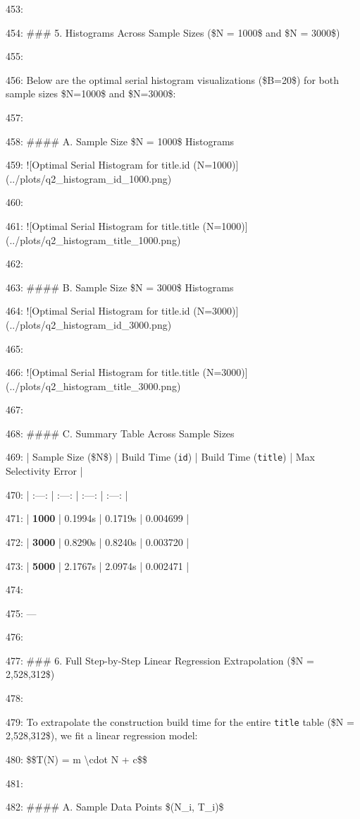 \documentclass[11pt,a4paper]{article}
\begin{document}
453:

454: \#\#\# 5. Histograms Across Sample Sizes (\$N = 1000\$ and \$N = 3000\$)

455:

456: Below are the optimal serial histogram visualizations (\$B=20\$) for both sample sizes \$N=1000\$ and \$N=3000\$:

457:

458: \#\#\#\# A. Sample Size \$N = 1000\$ Histograms

459: ![Optimal Serial Histogram for title.id (N=1000)](../plots/q2\_histogram\_id\_1000.png)

460:

461: ![Optimal Serial Histogram for title.title (N=1000)](../plots/q2\_histogram\_title\_1000.png)

462:

463: \#\#\#\# B. Sample Size \$N = 3000\$ Histograms

464: ![Optimal Serial Histogram for title.id (N=3000)](../plots/q2\_histogram\_id\_3000.png)

465:

466: ![Optimal Serial Histogram for title.title (N=3000)](../plots/q2\_histogram\_title\_3000.png)

467:

468: \#\#\#\# C. Summary Table Across Sample Sizes

469: | Sample Size (\$N\$) | Build Time (\texttt{id}) | Build Time (\texttt{title}) | Max Selectivity Error |

470: | :---: | :---: | :---: | :---: |

471: | \textbf{1000} | 0.1994s | 0.1719s | 0.004699 |

472: | \textbf{3000} | 0.8290s | 0.8240s | 0.003720 |

473: | \textbf{5000} | 2.1767s | 2.0974s | 0.002471 |

474:

475: ---

476:

477: \#\#\# 6. Full Step-by-Step Linear Regression Extrapolation (\$N = 2,528,312\$)

478:

479: To extrapolate the construction build time for the entire \texttt{title} table (\$N = 2,528,312\$), we fit a linear regression model:

480: \$\$T(N) = m \textbackslash{}cdot N + c\$\$

481:

482: \#\#\#\# A. Sample Data Points \$(N\_i, T\_i)\$
\end{document}
